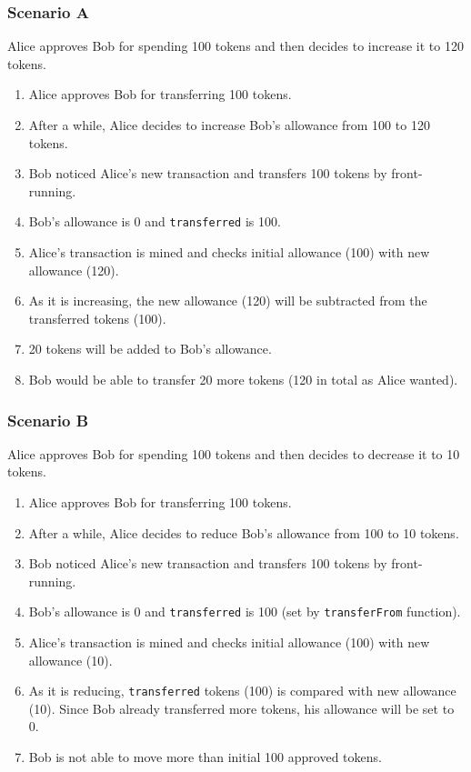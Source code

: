 \subsubsection*{Scenario A} Alice approves Bob for spending 100 tokens and then decides to increase it to 120 tokens.
\begin{enumerate}
	\item Alice approves Bob for transferring 100 tokens.
	\item After a while, Alice decides to increase Bob’s allowance from 100 to 120 tokens.
	\item Bob noticed Alice’s new transaction and transfers 100 tokens by front-running.
	\item Bob’s allowance is 0 and \texttt{transferred} is 100.
	\item Alice’s transaction is mined and checks initial allowance (100) with new allowance (120).
	\item As it is increasing, the new allowance (120) will be subtracted from the transferred tokens (100).
	\item 20 tokens will be added to Bob’s allowance.
	\item Bob would be able to transfer 20 more tokens (120 in total as Alice wanted).\newline
\end{enumerate}
 
\subsubsection*{Scenario B} Alice approves Bob for spending 100 tokens and then decides to decrease it to 10 tokens.
\begin{enumerate}
	\item Alice approves Bob for transferring 100 tokens.
	\item After a while, Alice decides to reduce Bob’s allowance from 100 to 10 tokens.
	\item Bob noticed Alice’s new transaction and transfers 100 tokens by front-running.
	\item Bob’s allowance is 0 and \texttt{transferred} is 100 (set by \texttt{transferFrom} function).
	\item Alice’s transaction is mined and checks initial allowance (100) with new allowance (10).
	\item As it is reducing, \texttt{transferred} tokens (100) is compared with new allowance (10). Since Bob already transferred more tokens, his allowance will be set to 0.
	\item Bob is not able to move more than initial 100 approved tokens.
\end{enumerate}

